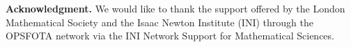 \documentclass[12pt]{article}
\numberwithin{equation}{section}
\begin{document}



\bigskip

\noindent\textbf{Acknowledgment. } We would like to thank the support offered by the London Mathematical Society and the Isaac Newton Institute (INI) through the OPSFOTA network via the INI Network Support for Mathematical Sciences. 
\end{document}
